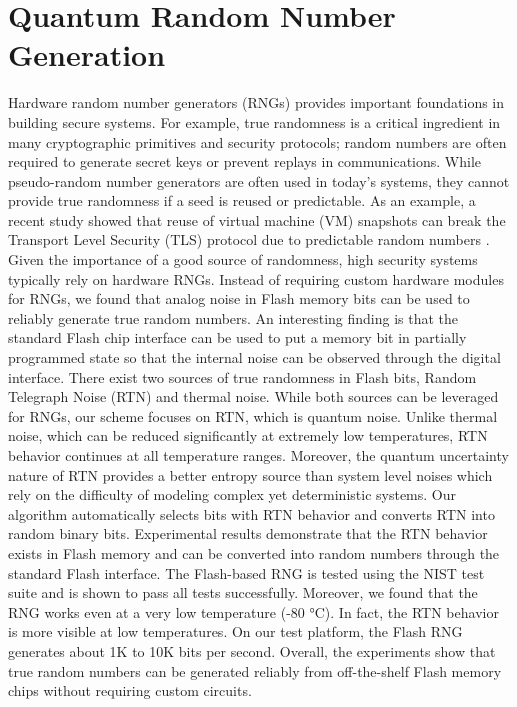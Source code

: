 \section{Quantum Random Number Generation}
Hardware random number generators (RNGs) provides important foundations 
in building secure systems. For example, true randomness is a critical 
ingredient in many cryptographic primitives and security protocols; random 
numbers are often required to generate secret keys or prevent replays in 
communications. While pseudo-random number generators are often used in today’s 
systems, they cannot provide true randomness if a seed is reused or predictable. 
As an example, a recent study showed that reuse of virtual machine (VM) snapshots 
can break the Transport Level Security (TLS) protocol due to predictable random 
numbers \cite{ristenpart2010good}. Given the importance of a good source of randomness, high security 
systems typically rely on hardware RNGs.
Instead of requiring custom hardware modules for RNGs, we found that analog 
noise in Flash memory bits can be used to reliably generate true random numbers. 
An interesting finding is that the standard Flash chip interface can be used to 
put a memory bit in partially programmed state so that the internal noise can be 
observed through the digital interface. There exist two sources of true randomness 
in Flash bits, Random Telegraph Noise (RTN) and thermal noise. While both sources 
can be leveraged for RNGs, our scheme focuses on RTN, which is quantum noise. Unlike 
thermal noise, which can be reduced significantly at extremely low temperatures, 
RTN behavior continues at all temperature ranges. Moreover, the quantum uncertainty 
nature of RTN provides a better entropy source than system level noises which rely 
on the difficulty of modeling complex yet deterministic systems. Our algorithm 
automatically selects bits with RTN behavior and converts RTN into random binary bits.
Experimental results demonstrate that the RTN behavior exists in Flash memory and 
can be converted into random numbers through the standard Flash interface. The 
Flash-based RNG is tested using the NIST test suite \cite{rukhin2001statistical} and is shown to 
pass all tests successfully. Moreover, we found that the RNG works even 
at a very low temperature (-80 °C). In fact, the RTN behavior is more visible at 
low temperatures.  On our test platform, the Flash RNG generates about 1K 
to 10K bits per second. Overall, the experiments show that true random 
numbers can be generated reliably from off-the-shelf Flash memory chips 
without requiring custom circuits.

